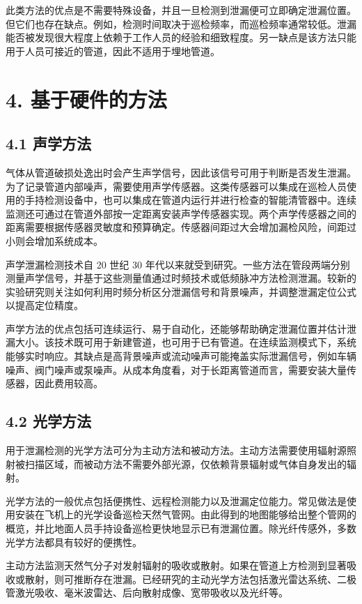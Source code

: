 此类方法的优点是不需要特殊设备，并且一旦检测到泄漏便可立即确定泄漏位置。但它们也存在缺点。例如，检测时间取决于巡检频率，而巡检频率通常较低。泄漏能否被发现很大程度上依赖于工作人员的经验和细致程度。另一缺点是该方法只能用于人员可接近的管道，因此不适用于埋地管道。

\section*{4. 基于硬件的方法}

\subsection*{4.1 声学方法}

气体从管道破损处逸出时会产生声学信号，因此该信号可用于判断是否发生泄漏。为了记录管道内部噪声，需要使用声学传感器。这类传感器可以集成在巡检人员使用的手持检测设备中，也可以集成在管道内运行并进行检查的智能清管器中。连续监测还可通过在管道外部按一定距离安装声学传感器实现。两个声学传感器之间的距离需要根据传感器灵敏度和预算确定。传感器间距过大会增加漏检风险，间距过小则会增加系统成本。

声学泄漏检测技术自 20 世纪 30 年代以来就受到研究。一些方法在管段两端分别测量声学信号，并基于这些测量值通过时频技术或低频脉冲方法检测泄漏。较新的实验研究则关注如何利用时频分析区分泄漏信号和背景噪声，并调整泄漏定位公式以提高定位精度。

声学方法的优点包括可连续运行、易于自动化，还能够帮助确定泄漏位置并估计泄漏大小。该技术既可用于新建管道，也可用于已有管道。在连续监测模式下，系统能够实时响应。其缺点是高背景噪声或流动噪声可能掩盖实际泄漏信号，例如车辆噪声、阀门噪声或泵噪声。从成本角度看，对于长距离管道而言，需要安装大量传感器，因此费用较高。

\subsection*{4.2 光学方法}

用于泄漏检测的光学方法可分为主动方法和被动方法。主动方法需要使用辐射源照射被扫描区域，而被动方法不需要外部光源，仅依赖背景辐射或气体自身发出的辐射。

光学方法的一般优点包括便携性、远程检测能力以及泄漏定位能力。常见做法是使用安装在飞机上的光学设备巡检天然气管网。由此得到的地图能够给出整个管网的概览，并比地面人员手持设备巡检更快地显示已有泄漏位置。除光纤传感外，多数光学方法都具有较好的便携性。

主动方法监测天然气分子对发射辐射的吸收或散射。如果在管道上方检测到显著吸收或散射，则可推断存在泄漏。已经研究的主动光学方法包括激光雷达系统、二极管激光吸收、毫米波雷达、后向散射成像、宽带吸收以及光纤等。

